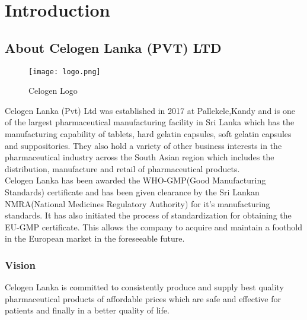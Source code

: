 \documentclass[a4paper,12pt]{article}
\begin{document}
	\newpage
	\begin{large}
	\tableofcontents
	\end{large}
	
	\newpage
	\listoffigures
	
	\newpage
	\listoftables
	\newpage
	\section{Introduction}
		\subsection{About Celogen Lanka (PVT) LTD}
			\vspace{1cm}
			\begin{figure}[H]
					\begin{center}				
						\texttt{[image: logo.png]}
					\end{center}
					\caption{Celogen Logo}
					\label{fig:Celogen Logo}
			\end{figure}
			
		Celogen Lanka (Pvt) Ltd was established in 2017 at Pallekele,Kandy and is one of the largest pharmaceutical manufacturing facility in Sri Lanka which has the manufacturing capability of tablets, hard gelatin capsules, soft gelatin capsules and suppositories. They also hold a variety of other business interests in the pharmaceutical industry across the South Asian region which includes the distribution, manufacture and retail of pharmaceutical products.\\
		Celogen Lanka has been awarded the WHO-GMP(Good Manufacturing Standards) certificate and has been given clearance by the Sri Lankan NMRA(National Medicines Regulatory Authority) for it's manufacturing standards.
		It has also initiated the process of standardization for obtaining the EU-GMP certificate. 
		This allows the company to acquire and maintain a foothold in the European market in the foreseeable future. 
		
			\subsubsection{Vision}
		Celogen Lanka is committed to consistently produce and supply best quality pharmaceutical products of affordable prices which are safe and effective for patients and finally in a better quality of life.
		
\end{document}
